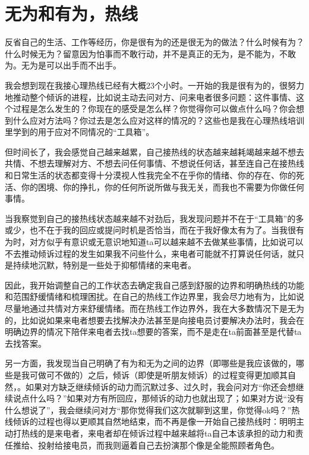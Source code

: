 \chapter{无为和有为，热线}




反省自己的生活、工作等经历，你是很有为的还是很无为的做法？什么时候有为？什么时候无为？留意因为怕事而不敢行动，并不是真正的无为，是不能为，不敢为。无为是可以出手而不出手。

我会想到现在我接心理热线已经有大概23个小时。一开始的我是很有为的，很努力地推动整个倾诉的进程，比如说主动去问对方、问来电者很多问题：这件事情、这个过程是怎么发生的？你现在的感受是怎么样？你觉得你可以做点什么吗？你会想到什么应对方法吗？你过去是怎么应对这样的情况的？这些也是我在心理热线培训里学到的用于应对不同情况的“工具箱”。

但时间长了，我会感觉自己越来越累，自己接热线的状态越来越耗竭\pozhehao{}越来越不想去共情、不想去理解对方、不想去问任何事情、不想说任何话，甚至连自己在接热线和日常生活的状态都变得十分漠视人性\pozhehao{}我完全不在乎你的情绪、你的存在、你的死活、你的困境、你的挣扎，你的任何所说所做与我无关，而我也不需要为你做任何事情。

当我察觉到自己的接热线状态越来越不对劲后，我发现问题并不在于“工具箱”的多或少，也不在于我的回应或提问时机是否恰当，而在于我好像太有为了。当我很有为时，对方似乎有意识或无意识地知道ta可以越来越不去做某些事情，比如说可以不去推动倾诉过程的发生\pozhehao{}如果我不问些什么，来电者可能就不打算说任何话，就只是持续地沉默，特别是一些处于抑郁情绪的来电者。

因此，我开始调整自己的工作状态\pozhehao{}去确定我自己感到舒服的边界和明确热线的功能和范围\pozhehao{}舒缓情绪和梳理困扰。在自己的热线工作边界里，我会尽力地有为，比如说尽量地通过共情对方来舒缓情绪。而在热线工作边界外，我在大多数情况下是无为的，比如说如果来电者想要去找解决办法甚至是向接电员讨要解决办法时，我会在明确边界的情况下陪伴来电者去找ta想要的答案，而不是走在ta前面甚至是代替ta去找答案。

另一方面，我发现当自己明确了有为和无为之间的边界（即哪些是我应该做的，哪些是我可做可不做的）之后，倾诉（即使是听朋友倾诉）的过程变得更加顺其自然，。如果对方缺乏继续倾诉的动力而沉默过多、过久时，我会问对方“你还会想继续说点什么吗？”如果对方有所回应，那倾诉的动力也就出现了；如果对方说“没有什么想说了”，我会继续问对方“那你觉得我们这次就聊到这里，你觉得ok吗？”热线倾诉的过程也得以更顺其自然地结束，而不再是像一开始自己接热线时：明明主动打热线的是来电者，来电者却在倾诉过程中越来越将ta自己本该承担的动力和责任推给、投射给接电员，而我则逼着自己去扮演那个像是全能照顾者角色。

